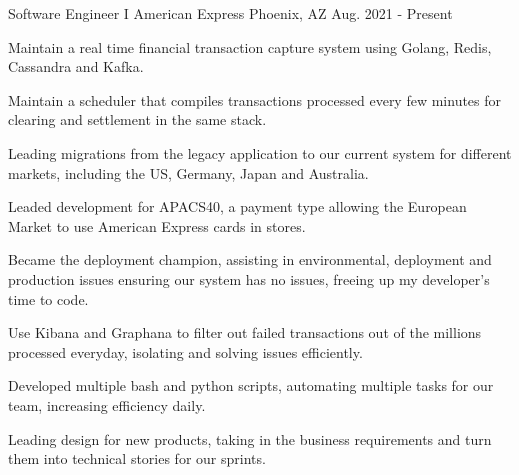 

\begin{cventries}

  \cventry
    {Software Engineer I} %
    {American Express} %
    {Phoenix, AZ} %
    {Aug. 2021 - Present} %
    {
      \begin{cvitems} %
        \item {Maintain a real time financial transaction capture system using Golang, Redis, Cassandra and Kafka.}
        \item {Maintain a scheduler that compiles transactions processed every few minutes for clearing and settlement in the same stack.}
        \item {Leading migrations from the legacy application to our current system for different markets, including the US, Germany, Japan and Australia.}
        \item {Leaded development for APACS40, a payment type allowing the European Market to use American Express cards in stores.}
        \item {Became the deployment champion, assisting in environmental, deployment and production issues ensuring our system has no issues, freeing up my developer's time to code.}
        \item {Use Kibana and Graphana to filter out failed transactions out of the millions processed everyday, isolating and solving issues efficiently.}
        \item {Developed multiple bash and python scripts, automating multiple tasks for our team, increasing efficiency daily.}
        \item {Leading design for new products, taking in the business requirements and turn them into technical stories for our sprints.}
      \end{cvitems}
    }


\end{cventries}
